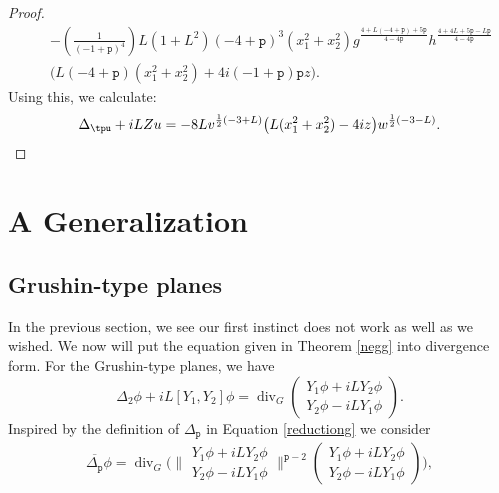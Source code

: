 \documentclass[12pt]{amsart}
\theoremstyle{plain}
\theoremstyle{definition}
\numberwithin{equation}{section}
\begin{document}
\begin{proof}
\begin{eqnarray*}
&& -\left(\frac{1}{(-1 + {\texttt{p}})^4}\right)L (1 + L^2) (-4 + {\texttt{p}})^3 (x_1^2 + x_2^2) g^{\frac{
  4 + L (-4 + {\texttt{p}}) + 5 {\texttt{p}}}{4 - 4 {\texttt{p}}}} h^{\frac{4 + 4 L + 5 {\texttt{p}} - L {\texttt{p}}} {4 - 4 {\texttt{p}}}}\\
&&\mbox{}   \big(L (-4 + {\texttt{p}}) (x_1^2 + x_2^2) + 4 i (-1 + {\texttt{p}}) {\texttt{p}} z\big).
\end{eqnarray*}
Using this, we calculate:
\begin{eqnarray*}
\Delta_\tpu+iLZu
= -8 L v^{\frac{1}{2} (-3 + L)} \big(L (x_1^2 + x_2^2) - 4 i z\big) w^{\frac{1}{2}(-3 - L)}. 
\end{eqnarray*}
\end{proof}

\section{A Generalization }
\subsection{Grushin-type planes}
In the previous section, we see our first instinct does not work as well as we wished. We now will put the equation given in Theorem \ref{negg} into 
divergence form. For the Grushin-type planes, we have 
\begin{equation}
\Delta_2\phi+iL[Y_1, Y_2]\phi={\operatorname{div}}_G\left( \begin{array}{c}
Y_1\phi+iLY_2\phi\\
Y_2\phi-iLY_1\phi
\end{array} \right).\label{motive}
\end{equation}
Inspired by the definition of $\Delta_{\texttt{p}}$ in Equation \eqref{reductiong}  we consider 
\begin{eqnarray}
\overline{\Delta_{\texttt{p}}}\phi={\operatorname{div}}_G{\Bigg( \bigg\| \begin{array}{c}
 Y_1\phi+iLY_2\phi\\
 Y_2\phi-iLY_1\phi
\end{array} \bigg\|^{{\texttt{p}}-2} 
 \left( \begin{array}{c}
Y_1\phi+iLY_2\phi\\
Y_2\phi-iLY_1\phi
\end{array} \right) \Bigg)}, \label{trad}
\end{eqnarray}
\end{document}
